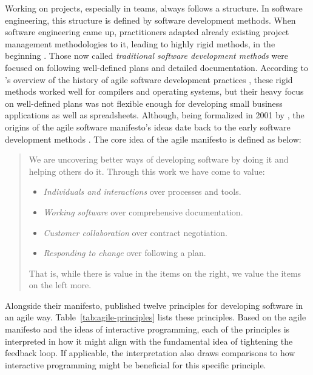 Working on projects, especially in teams, always follows a structure.
In software engineering, this structure is defined by software development methods.
When software engineering came up, practitioners adapted already existing project management methodologies to it, leading to highly rigid methods, in the beginning \cite{misra_agile_2012}.
Those now called \emph{traditional software development methods} were focused on following well-defined plans and detailed documentation.
According to \citeauthor{misra_agile_2012}'s overview of the history of agile software development practices \cite{misra_agile_2012}, these rigid methods worked well for compilers and operating systems, but their heavy focus on well-defined plans was not flexible enough for developing small business applications as well as spreadsheets.
Although, being formalized in 2001 by \citeauthor{beck_manifesto_2001}, the origins of the agile software manifesto's ideas \cite{beck_manifesto_2001} date back to the early software development methods \cite{van_der_aalst_historical_2008}.
The core idea of the agile manifesto is defined as below:
%
\begin{quote}
    We are uncovering better ways of developing software by doing it and helping others do it.
    Through this work we have come to value:
    \begin{itemize}
        \item \emph{Individuals and interactions} over processes and tools.
        \item \emph{Working software} over comprehensive documentation.
        \item \emph{Customer collaboration} over contract negotiation.
        \item \emph{Responding to change} over following a plan.
    \end{itemize}
    That is, while there is value in the items on the right, we value the items on the left more.
\end{quote}
%

Alongside their manifesto, \citeauthor{beck_manifesto_2001} published twelve principles for developing software in an agile way.
Table~\ref{tab:agile-principles} lists these principles.
Based on the agile manifesto and the ideas of interactive programming, each of the principles is interpreted in how it might align with the fundamental idea of tightening the feedback loop.
If applicable, the interpretation also draws comparisons to how interactive programming might be beneficial for this specific principle.

